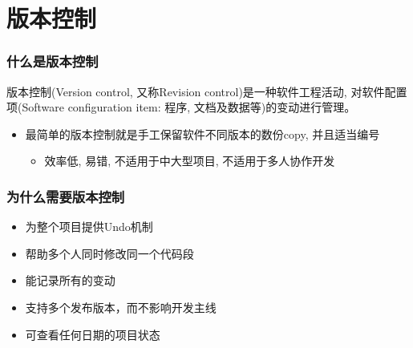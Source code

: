 \documentclass[compress]{beamer}
\begin{document}
\section{版本控制}

\begin{frame}
\frametitle{什么是版本控制}
版本控制(Version control, 又称Revision control)是一种软件工程活动,
对软件配置项(Software configuration item: 程序, 文档及数据等)的变动进行管理。
\begin{itemize}
\item 最简单的版本控制就是手工保留软件不同版本的数份copy, 并且适当编号
    \begin{itemize}
    \item 效率低, 易错, 不适用于中大型项目, 不适用于多人协作开发
    \end{itemize}
\end{itemize}

\end{frame}

\begin{frame}
  \frametitle{为什么需要版本控制}
  \begin{itemize}
	\item 为整个项目提供Undo机制
	\item 帮助多个人同时修改同一个代码段
	\item 能记录所有的变动
	\item 支持多个发布版本，而不影响开发主线
	\item 可查看任何日期的项目状态
  \end{itemize}
\end{frame}
\end{document}
